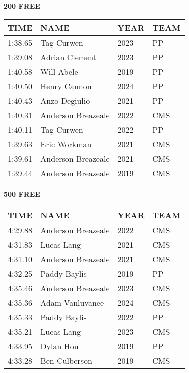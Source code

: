 \begin{minipage}[t]{0.48\textwidth}
\centering
\textbf{200 FREE}\\[0.05cm]
\begin{tabular}{@{}p{1.8cm}p{2.8cm}p{1.2cm}p{1.4cm}@{}}
\hline
\textbf{TIME} & \textbf{NAME} & \textbf{YEAR} & \textbf{TEAM} \\
\hline
1:38.65 & Tag Curwen & 2023 & PP \\
1:39.08 & Adrian Clement & 2023 & PP \\
1:40.58 & Will Abele & 2019 & PP \\
1:40.50 & Henry Cannon & 2024 & PP \\
1:40.43 & Anzo Degiulio & 2021 & PP \\
1:40.31 & Anderson Breazeale & 2022 & CMS \\
1:40.11 & Tag Curwen & 2022 & PP \\
1:39.63 & Eric Workman & 2021 & CMS \\
1:39.61 & Anderson Breazeale & 2021 & CMS \\
1:39.44 & Anderson Breazeale & 2019 & CMS \\
\hline
\end{tabular}
\end{minipage}\hfill
\begin{minipage}[t]{0.48\textwidth}
\centering
\textbf{500 FREE}\\[0.05cm]
\begin{tabular}{@{}p{1.8cm}p{2.8cm}p{1.2cm}p{1.4cm}@{}}
\hline
\textbf{TIME} & \textbf{NAME} & \textbf{YEAR} & \textbf{TEAM} \\
\hline
4:29.88 & Anderson Breazeale & 2022 & CMS \\
4:31.83 & Lucas Lang & 2021 & CMS \\
4:31.10 & Anderson Breazeale & 2021 & CMS \\
4:32.25 & Paddy Baylis & 2019 & PP \\
4:35.46 & Anderson Breazeale & 2023 & CMS \\
4:35.36 & Adam Vanluvanee & 2024 & CMS \\
4:35.33 & Paddy Baylis & 2022 & PP \\
4:35.21 & Lucas Lang & 2023 & CMS \\
4:33.95 & Dylan Hou & 2019 & PP \\
4:33.28 & Ben Culberson & 2019 & CMS \\
\hline
\end{tabular}
\end{minipage}

